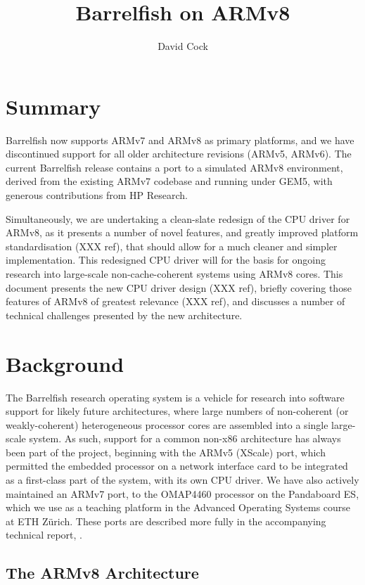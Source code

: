 \documentclass[a4paper,twoside]{report}
\title{Barrelfish on ARMv8}
\author{David Cock}
\begin{document}
\maketitle

\chapter{Summary}

Barrelfish now supports ARMv7 and ARMv8 as primary platforms, and we have
discontinued support for all older architecture revisions (ARMv5, ARMv6). The
current Barrelfish release contains a port to a simulated ARMv8 environment,
derived from the existing ARMv7 codebase and running under GEM5, with generous
contributions from HP Research.

Simultaneously, we are undertaking a clean-slate redesign of the CPU driver
for ARMv8, as it presents a number of novel features, and greatly improved
platform standardisation (XXX ref), that should allow for a much cleaner and
simpler implementation. This redesigned CPU driver will for the basis for
ongoing research into large-scale non-cache-coherent systems using ARMv8
cores. This document presents the new CPU driver design (XXX ref), briefly
covering those features of ARMv8 of greatest relevance (XXX ref), and
discusses a number of technical challenges presented by the new architecture.

\chapter{Background}

The Barrelfish research operating system is a vehicle for research into
software support for likely future architectures, where large numbers of
non-coherent (or weakly-coherent) heterogeneous processor cores are assembled
into a single large-scale system. As such, support for a common non-x86
architecture has always been part of the project, beginning with the ARMv5
(XScale) port, which permitted the embedded processor on a network interface
card to be integrated as a first-class part of the system, with its own CPU
driver. We have also actively maintained an ARMv7 port, to the OMAP4460
processor on the Pandaboard ES, which we use as a teaching platform in the
Advanced Operating Systems course at ETH Z\"urich. These ports are described
more fully in the accompanying technical report, \citet{btn017-arm}.

\section{The ARMv8 Architecture}
\end{document}
